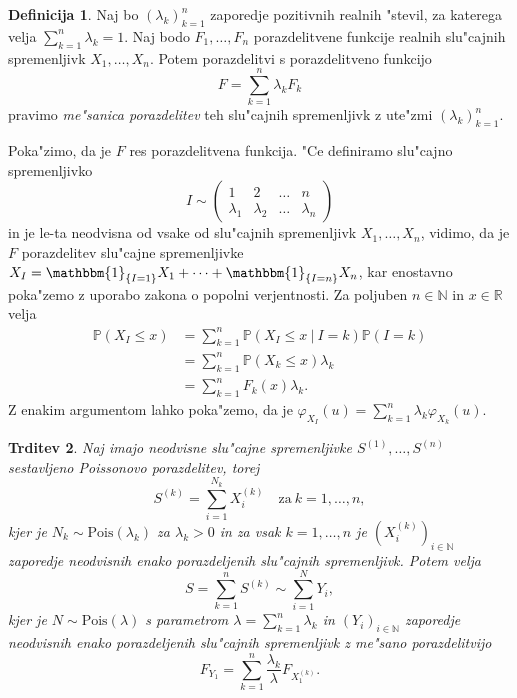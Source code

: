 \documentclass[12pt, a4paper, reqno]{amsart}
\theoremstyle{definition}
\newtheorem{definicija}{Definicija}[section]
\theoremstyle{plain}
\newtheorem{trditev}[definicija]{Trditev}
\newcommand{\R}{\mathbb{R}}
\newcommand{\N}{\mathbb{N}}
\newcommand{\Prob}{\mathbb{P}}
\newcommand{\1}{\mathds{1}}
\newcommand{\Pois}[1]{\text{Pois}(#1)}
\begin{document}
    \begin{definicija}
        Naj bo $(\lambda_k)_{k=1}^n$ zaporedje pozitivnih realnih "stevil, za katerega velja 
        $\sum_{k=1}^n\lambda_k = 1$. Naj bodo $F_1, \dots, F_n$ porazdelitvene funkcije
        realnih slu"cajnih spremenljivk $X_1, \dots, X_n$. Potem porazdelitvi s porazdelitveno 
        funkcijo 
        \begin{equation*}
            F = \sum_{k=1}^n\lambda_kF_k
        \end{equation*}
        pravimo \textit{me"sanica porazdelitev} teh slu"cajnih spremenljivk z ute"zmi $(\lambda_k)_{k=1}^n$.
    \end{definicija}
    \noindent
    Poka"zimo, da je $F$ res porazdelitvena funkcija. "Ce definiramo slu"cajno spremenljivko 
    $$
    I \sim 
    \begin{pmatrix}
        1 & 2  & \dots & n\\
        \lambda_1 & \lambda_2  & \dots & \lambda_n
    \end{pmatrix}
    $$
    in je le-ta neodvisna od vsake od slu"cajnih spremenljivk $X_1, \dots, X_n$, vidimo, da je $F$ 
    porazdelitev slu"cajne spremenljivke $X_I = \mathbbm{1}_{\{I = 1\}}X_1 + \cdots + \mathbbm{1}_{\{I = n\}}X_n$, 
    kar enostavno poka"zemo z uporabo zakona o popolni verjentnosti. Za poljuben $n\in\N$ in $x\in\R$ velja 
    \begin{align*}
        \Prob\left(X_I \leq x\right) 
        &= \sum_{k=1}^n\Prob\left(X_I \leq x \ \big| \ I = k\right)\Prob\left(I = k\right) \\
        &= \sum_{k=1}^n\Prob\left(X_k \leq x\right)\lambda_k \\
        &= \sum_{k=1}^nF_k(x)\lambda_k.
    \end{align*}
    Z enakim argumentom lahko poka"zemo, da je $\varphi_{X_I}(u) = \sum_{k=1}^n\lambda_k\varphi_{X_k}(u)$.


    \begin{trditev}
        Naj imajo neodvisne slu"cajne spremenljivke $S^{(1)}, \dots, S^{(n)}$ sestavljeno Poissonovo porazdelitev, torej 
        \begin{equation*}
            S^{(k)} = \sum_{i=1}^{N_k}X_i^{(k)} \quad \text{za} \ k=1, \dots, n,
        \end{equation*}
        kjer je $N_k\sim \Pois{\lambda_k}$ za $\lambda_k > 0$ in za vsak $k = 1, \dots, n$ je $(X_i^{(k)})_{i\in\N}$ 
        zaporedje neodvisnih enako porazdeljenih slu"cajnih spremenljivk. Potem velja   
        \begin{equation*}
            S = \sum_{k=1}^nS^{(k)} \sim \sum_{i=1}^{N}Y_i,
        \end{equation*}
        kjer je $N\sim\Pois{\lambda}$ s parametrom $\lambda = \sum_{k=1}^n\lambda_k$ in $(Y_i)_{i\in\N}$ zaporedje
        neodvisnih enako porazdeljenih slu"cajnih spremenljivk z me"sano porazdelitvijo
        \begin{equation*}
        F_{Y_1} = \sum_{k=1}^n\frac{\lambda_k}{\lambda}F_{X_1^{(k)}}.
        \end{equation*}
        \label{trd:vsotaCPDjeCPD}
    \end{trditev}
\end{document}
